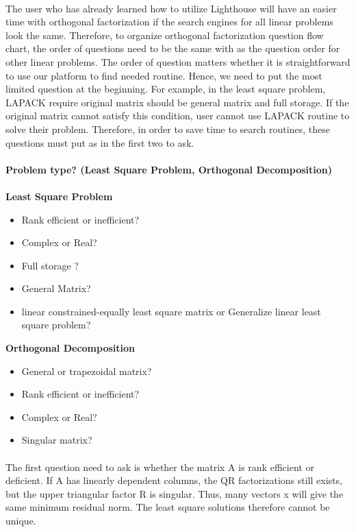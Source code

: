 \documentclass[pdftex,12pt,a4paper]{article}
\begin{document}
\paragraph{}					
The user who has already learned how to utilize Lighthouse will have an easier time with orthogonal factorization if the search engines for all linear problems look the same. Therefore, to organize orthogonal factorization question flow chart, the order of questions need to be the same with as the question order for other linear problems.  The order of  question matters whether it is straightforward to use our platform to find needed routine. Hence, we need to put the most limited question at the beginning. For example, in the least square problem, LAPACK require original matrix should be general matrix and full storage. If the original matrix cannot satisfy this condition, user cannot use LAPACK routine to solve their problem. Therefore, in order to save time to search routines, these questions must put as in the first two to ask. 
\\
\\
\textbf{Problem type? (Least Square Problem, Orthogonal Decomposition) }
\\
\\
\textbf{Least Square Problem}
\begin{itemize}
\item Rank efficient or inefficient?
\item Complex or Real?
\item Full storage ?
\item General Matrix?
\item linear constrained-equally  least square matrix or Generalize linear least square problem?
\end{itemize}
\textbf{Orthogonal Decomposition}
\begin{itemize}
\item General or trapezoidal matrix?
\item Rank efficient or inefficient?
\item Complex or Real?
\item Singular matrix?
\end{itemize}
\paragraph{}
The first question need to ask is whether the matrix A is rank efficient or deficient. If A has linearly dependent columns, the QR factorizations still exists, but the upper triangular factor R is singular. Thus, many vectors x will give the same minimum residual norm. The least square solutions therefore cannot be unique. 
\end{document}
